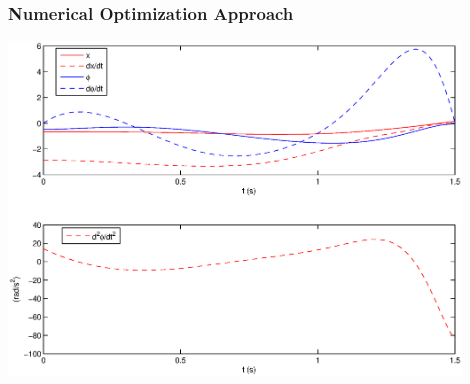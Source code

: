 \documentclass[
compress]
{beamer}
\begin{document}
\begin{frame}
\frametitle{Numerical Optimization Approach}
\centering
\includegraphics[width=0.9\textwidth]{ballbeammatlab.eps}
\end{frame}
\end{document}
